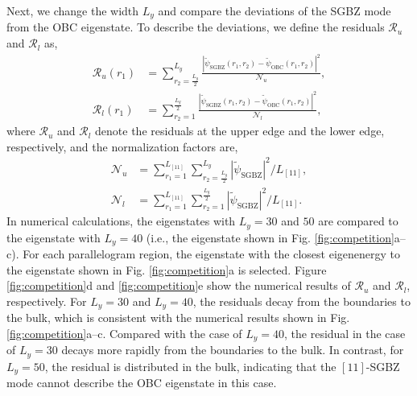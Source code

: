 \documentclass[pdflatex,sn-nature, iicol]{sn-jnl}%
\theoremstyle{thmstyleone}%
\theoremstyle{thmstyletwo}%
\theoremstyle{thmstylethree}%
\begin{document}
Next, we change the width $L_{y}$ and compare the deviations of the
SGBZ mode from the OBC eigenstate. To describe the deviations, we
define the residuals $\mathcal{R}_{u}$ and $\mathcal{R}_{l}$ as,
\begin{align}
\mathcal{R}_{u}\left(r_{1}\right) & =\sum_{r_{2}=\frac{L_{y}}{2}}^{L_{y}}\frac{\left|\tilde{\psi}_{\text{SGBZ}}\left(r_{1},r_{2}\right)-\tilde{\psi}_{\text{OBC}}\left(r_{1},r_{2}\right)\right|^{2}}{\mathcal{N}_{u}},\label{eq:residual-upper}\\
\mathcal{R}_{l}\left(r_{1}\right) & =\sum_{r_{2}=1}^{\frac{L_{y}}{2}}\frac{\left|\tilde{\psi}_{\text{SGBZ}}\left(r_{1},r_{2}\right)-\tilde{\psi}_{\text{OBC}}\left(r_{1},r_{2}\right)\right|^{2}}{\mathcal{N}_{l}},\label{eq:residual-lower}
\end{align}
where $\mathcal{R}_{u}$ and $\mathcal{R}_{l}$ denote the residuals
at the upper edge and the lower edge, respectively, and the normalization
factors are, 
\begin{align}
\mathcal{N}_{u} & =\sum_{r_{1}=1}^{L_{[11]}}\sum_{r_{2}=\frac{L_{y}}{2}}^{L_{y}}\left|\tilde{\psi}_{\text{SGBZ}}\right|^{2}/L_{[11]},\\
\mathcal{N}_{l} & =\sum_{r_{1}=1}^{L_{[11]}}\sum_{r_{2}=1}^{\frac{L_{y}}{2}}\left|\tilde{\psi}_{\text{SGBZ}}\right|^{2}/L_{[11]}.
\end{align}
In numerical calculations, the eigenstates with $L_{y}=30$ and $50$
are compared to the eigenstate with $L_{y}=40$ (i.e., the eigenstate
shown in Fig. \ref{fig:competition}a--c). For each parallelogram
region, the eigenstate with the closest eigenenergy to the eigenstate
shown in Fig. \ref{fig:competition}a is selected. Figure \ref{fig:competition}d
and \ref{fig:competition}e show the numerical results of $\mathcal{R}_{u}$
and $\mathcal{R}_{l}$, respectively. For $L_{y}=30$ and $L_{y}=40$,
the residuals decay from the boundaries to the bulk, which is consistent
with the numerical results shown in Fig. \ref{fig:competition}a--c.
Compared with the case of $L_{y}=40$, the residual in the case of
$L_{y}=30$ decays more rapidly from the boundaries to the bulk. In
contrast, for $L_{y}=50$, the residual is distributed in the bulk,
indicating that the $[11]$-SGBZ mode cannot describe the OBC eigenstate
in this case.
\end{document}
